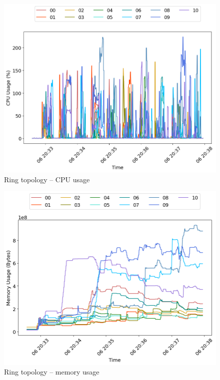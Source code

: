 \begin{minipage}{0.5\linewidth}
\begin{figure}[H]
\captionsetup{justification=centering,width=0.8\linewidth}
\includegraphics[width=\linewidth]{figures/ring/cpu_usage.png}
\caption{Ring topology -- CPU usage}
\label{fig:ring-cpu_usage}
\end{figure}
\end{minipage}
\begin{minipage}{0.5\linewidth}
\begin{figure}[H]
\captionsetup{justification=centering,width=0.8\linewidth}
\includegraphics[width=\linewidth]{figures/ring/mem_usage.png}
\caption{Ring topology -- memory usage}
\label{fig:ring-mem_usage}
\end{figure}
\end{minipage}


